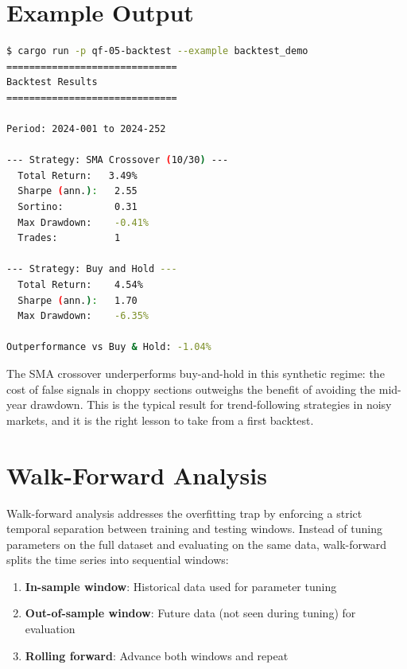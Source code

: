\section{Example Output}

\begin{lstlisting}[language=bash]
$ cargo run -p qf-05-backtest --example backtest_demo
==============================
Backtest Results
==============================

Period: 2024-001 to 2024-252

--- Strategy: SMA Crossover (10/30) ---
  Total Return:   3.49%
  Sharpe (ann.):   2.55
  Sortino:         0.31
  Max Drawdown:    -0.41%
  Trades:          1

--- Strategy: Buy and Hold ---
  Total Return:    4.54%
  Sharpe (ann.):   1.70
  Max Drawdown:    -6.35%

Outperformance vs Buy & Hold: -1.04%
\end{lstlisting}

The SMA crossover underperforms buy-and-hold in this synthetic regime: the
cost of false signals in choppy sections outweighs the benefit of avoiding
the mid-year drawdown. This is the typical result for trend-following
strategies in noisy markets, and it is the right lesson to take from a first
backtest.

\section{Walk-Forward Analysis}
\label{sec:walk-forward}


Walk-forward analysis addresses the overfitting trap by enforcing a strict
temporal separation between training and testing windows. Instead of tuning
parameters on the full dataset and evaluating on the same data, walk-forward
splits the time series into sequential windows:

\begin{enumerate}
    \item \textbf{In-sample window}: Historical data used for parameter tuning
    \item \textbf{Out-of-sample window}: Future data (not seen during tuning) for evaluation
    \item \textbf{Rolling forward}: Advance both windows and repeat
\end{enumerate}

